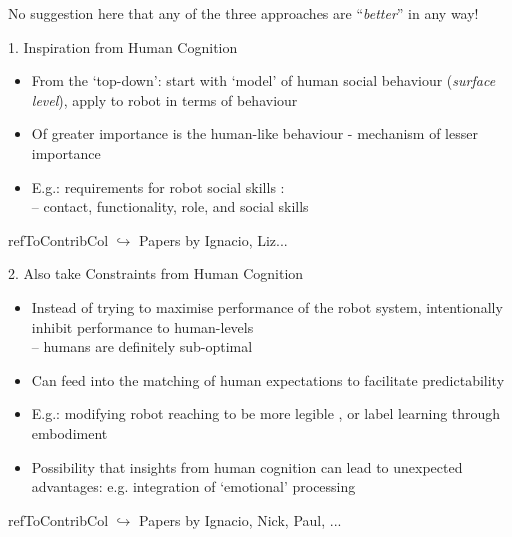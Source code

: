 \documentclass[compress]{beamer}
\newcommand{\refToContrib}[1]{%
    \begin{beamercolorbox}[wd=\linewidth,ht=2ex,dp=0.7ex]{refToContribCol}%
    \hspace{0.5em}$\hookrightarrow$ #1%
    \end{beamercolorbox}%
}%
\begin{document}
\begin{frame}{}

    \begin{exampleblock}{No suggestion here that any of the three approaches are ``\textit{better}'' in any way!}
        
    \end{exampleblock}
    \vspace{2em}
    \centering

\end{frame}


\begin{frame}{1. Inspiration from Human Cognition}

	\begin{itemize}
        \item From the `top-down': start with `model' of human social behaviour (\textit{surface level}), apply to robot in terms of behaviour
        \item Of greater importance is the human-like behaviour - mechanism of lesser importance
        \item E.g.: requirements for robot social skills \cite{Dautenhahn2007}:\\-- contact, functionality, role, and social skills
    \end{itemize}
    
    \refToContrib{Papers by Ignacio, Liz...}

\end{frame}


\begin{frame}{2. Also take Constraints from Human Cognition}

	\begin{itemize}
        \item Instead of trying to maximise performance of the robot system,
            intentionally inhibit performance to human-levels \\ {\footnotesize -- humans are definitely sub-optimal }
        \item Can feed into the matching of human expectations to facilitate predictability
        \item E.g.: modifying robot reaching to be more legible \cite{Dragan2013}, or label learning through embodiment \cite{Morse2010}
        \item<2-> Possibility that insights from human cognition can lead to unexpected advantages: e.g. integration of `emotional' processing \cite{Gros2010}
    \end{itemize}
    
    \refToContrib{Papers by Ignacio, Nick, Paul, ...}

\end{frame}
\end{document}
